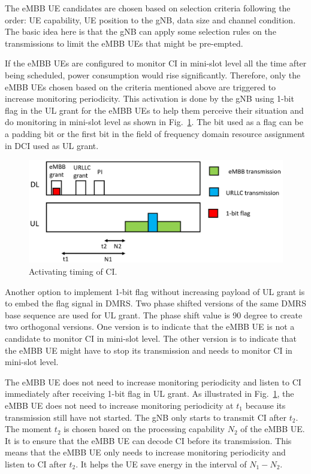 \documentclass{ieeeaccess}
\begin{document}
The eMBB UE candidates are chosen based on selection criteria following the order: UE capability, UE position to the gNB, data size and channel condition. The basic idea here is that the gNB can apply some selection rules on the transmissions to limit the eMBB UEs that might be pre-empted.

If the eMBB UEs are configured to monitor CI in mini-slot level all the time after being scheduled, power consumption would rise significantly. Therefore, only the eMBB UEs chosen based on the criteria mentioned above are triggered to increase monitoring periodicity. This activation is done by the gNB using 1-bit flag in the UL grant for the eMBB UEs to help them perceive their situation and do monitoring in mini-slot level as shown in Fig.~\ref{fig17}. The bit used as a flag can be a padding bit or the first bit in the field of frequency domain resource assignment in DCI used as UL grant.

\begin{figure}[htbp]
\centerline{\includegraphics[scale=0.17]{fig17.png}}
\caption{Activating timing of CI.}
\label{fig17}
\vspace{-2mm}
\end{figure}

Another option to implement 1-bit flag without increasing payload of UL grant is to embed the flag signal in DMRS. Two phase shifted versions of the same DMRS base sequence are used for UL grant. The phase shift value is 90 degree to create two orthogonal versions. One version is to indicate that the eMBB UE is not a candidate to monitor CI in mini-slot level. The other version is to indicate that the eMBB UE might have to stop its transmission and needs to monitor CI in mini-slot level. 

The eMBB UE does not need to increase monitoring periodicity and listen to CI immediately after receiving 1-bit flag in UL grant. As illustrated in Fig.~\ref{fig17}, the eMBB UE does not need to increase monitoring periodicity at $t_1$ because its transmission still have not started. The gNB only starts to transmit CI after $t_2$. The moment $t_2$ is chosen based on the processing capability $N_2$ of the eMBB UE. It is to ensure that the eMBB UE can decode CI before its transmission. This means that the eMBB UE only needs to increase monitoring periodicity and listen to CI after $t_2$. It helps the UE save energy in the interval of $N_1-N_2$.
\end{document}
